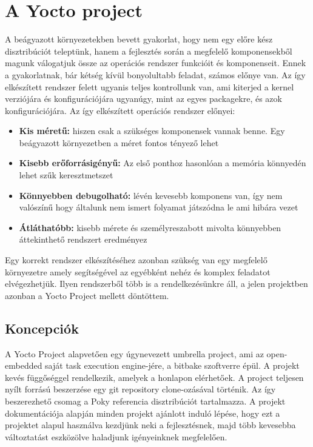 \chapter{A Yocto project}

A beágyazott környezetekben bevett gyakorlat, hogy nem egy előre kész disztribúciót teleptünk, hanem a fejlesztés során a megfelelő komponensekből magunk válogatjuk össze az operációs rendszer funkcióit és komponenseit. Ennek a
gyakorlatnak, bár kétség kívül bonyolultabb feladat, számos előnye van. Az így elkészített rendszer felett ugyanis teljes kontrollunk van, ami kiterjed a kernel verziójára és konfigurációjára ugyanúgy, mint az egyes packagekre,
és azok konfigurációjára. Az így elkészített operációs rendszer előnyei:

\begin{itemize}
\item \textbf{Kis méretű:} hiszen csak a szükséges komponensek vannak benne. Egy beágyazott környezetben a méret fontos tényező lehet
\item \textbf{Kisebb erőforrásigényű:} Az első ponthoz hasonlóan a memória könnyedén lehet szűk keresztmetszet
\item \textbf{Könnyebben debugolható:} lévén kevesebb komponens van, így nem valószínű hogy általunk nem ismert folyamat játszódna le ami hibára vezet
\item \textbf{Átláthatóbb:} kisebb mérete és személyreszabott mivolta könnyebben áttekinthető rendszert eredményez
\end{itemize}

Egy korrekt rendszer elkészítéséhez azonban szükség van egy megfelelő környezetre amely segítségével az egyébként nehéz és komplex feladatot elvégezhetjük. Ilyen rendszerből több is a rendelkezésünkre áll, a jelen projektben
azonban a Yocto Project mellett döntöttem.

\section{Koncepciók}

A Yocto Project alapvetően egy úgynevezett umbrella project, ami az open-embedded saját task execution engine-jére, a bitbake szoftverre épül. A projekt kevés függőséggel rendelkezik, amelyek a honlapon
elérhetőek. A project teljesen nyílt forrású beszerzése egy git repository clone-ozásával történik. Az így beszerezhető csomag a Poky referencia disztribúciót tartalmazza. A projekt dokumentációja alapján minden projekt ajánlott
induló lépése, hogy ezt a projektet alapul használva kezdjünk neki a fejlesztésnek, majd több kevesebba változtatást eszközölve haladjunk igényeinknek megfelelően.

